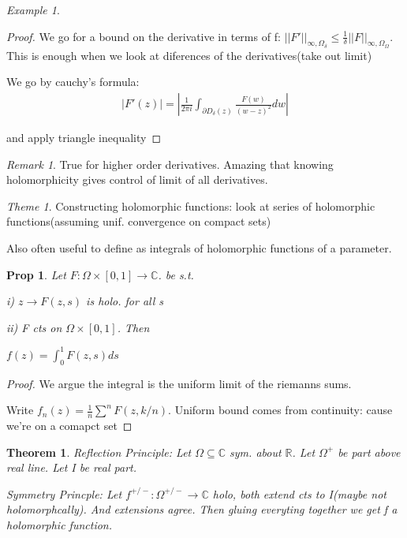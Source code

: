 \documentclass[11pt]{article}
\newcommand{\R}{\mathbb{R}}
\newcommand{\C}{\mathbb{C}}
\newtheorem{theorem}{Theorem}
\newtheorem{prop}{Prop}
\theoremstyle{remark}
\newtheorem{remark}{Remark}
\newtheorem{theme}{Theme}
\newtheorem{example}{Example}
\begin{document}
\begin{example}
\begin{proof}
	We go for a bound on the derivative in terms of f: $||F'||_{\infty,\Omega_{\delta}} \leq \frac{1}{\delta}||F||_{\infty,\Omega_{\Omega}}$. This is enough when we look at diferences of the derivatives(take out limit)

	We go by cauchy's formula:
	\begin{align*}
		|F'(z)| = |\frac{1}{2\pi i}\int_{\partial D_{\delta}(z)}\frac{F(w)}{(w-z)^2}dw|
	\end{align*}

	and apply triangle inequality
\end{proof}

\begin{remark}
	True for higher order derivatives. Amazing that knowing holomorphicity gives control of limit of all derivatives. 
\end{remark}

\begin{theme}
	Constructing holomorphic functions: look at series of holomorphic functions(assuming unif. convergence on compact sets)

	Also often useful to define as integrals of holomorphic functions of a parameter.
\end{theme}

\begin{prop}
	Let $F : \Omega \times [0,1] \to \C$. be s.t. 

	i) $z \to F(z,s)$ is holo. for all s

	ii) F cts on $\Omega \times [0,1]$. Then 

	$f(z) = \int_0^1 F(z,s) ds $
\end{prop}

\begin{proof}
	We argue the integral is the uniform limit of the riemanns sums. 

	Write $f_n(z) = \frac{1}{n}\sum^n F(z,k/n)$. Uniform bound comes from continuity: cause we're on a comapct set
\end{proof}

\begin{theorem}
	\textit{Reflection Principle}: Let $\Omega \subseteq \C$ sym. about $\R$. Let $\Omega^+$ be part above real line. Let I be real part. 

	\textit{Symmetry Princple:} Let $f^{+/-}: \Omega^{+/-} \to \mathbb{C}$ holo, both extend cts to I(maybe not holomorphcally). And extensions agree. Then gluing everyting together we get f a holomorphic function. 


\end{theorem}
\end{example}
\end{document}
